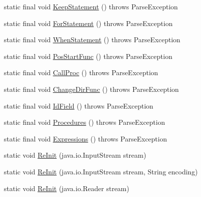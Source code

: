 \begin{DoxyCompactItemize}
\item 
static final void \mbox{\hyperlink{classorg_1_1tec_1_1comp_1_1interpreter_1_1_lang_parser_a405c37afd217408e11570b88520d8001}{Keep\+Statement}} ()  throws Parse\+Exception 
\item 
static final void \mbox{\hyperlink{classorg_1_1tec_1_1comp_1_1interpreter_1_1_lang_parser_a06360520488074a1a1fa3ced3417a5fa}{For\+Statement}} ()  throws Parse\+Exception 
\item 
static final void \mbox{\hyperlink{classorg_1_1tec_1_1comp_1_1interpreter_1_1_lang_parser_a9275380fc49d3c85996d406155673684}{When\+Statement}} ()  throws Parse\+Exception 
\item 
static final void \mbox{\hyperlink{classorg_1_1tec_1_1comp_1_1interpreter_1_1_lang_parser_a8863077e96b2b6e4dca2e4637b19e27b}{Pos\+Start\+Func}} ()  throws Parse\+Exception 
\item 
static final void \mbox{\hyperlink{classorg_1_1tec_1_1comp_1_1interpreter_1_1_lang_parser_ad976526414dbf20d9a5d1e3dcd94cdba}{Call\+Proc}} ()  throws Parse\+Exception 
\item 
static final void \mbox{\hyperlink{classorg_1_1tec_1_1comp_1_1interpreter_1_1_lang_parser_a30f030763ddb2f3dd46d9f0806cb5e83}{Change\+Dir\+Func}} ()  throws Parse\+Exception 
\item 
static final void \mbox{\hyperlink{classorg_1_1tec_1_1comp_1_1interpreter_1_1_lang_parser_a563be561b95084c5a41640d0bd559801}{Id\+Field}} ()  throws Parse\+Exception 
\item 
static final void \mbox{\hyperlink{classorg_1_1tec_1_1comp_1_1interpreter_1_1_lang_parser_a2554a84c19219dd423b352e350544084}{Procedures}} ()  throws Parse\+Exception 
\item 
static final void \mbox{\hyperlink{classorg_1_1tec_1_1comp_1_1interpreter_1_1_lang_parser_a05c6b36a7e76024a6c1d84d9f26df3fa}{Expressions}} ()  throws Parse\+Exception 
\item 
static void \mbox{\hyperlink{classorg_1_1tec_1_1comp_1_1interpreter_1_1_lang_parser_a94e815dda5476a089779061a106198b0}{Re\+Init}} (java.\+io.\+Input\+Stream stream)
\item 
static void \mbox{\hyperlink{classorg_1_1tec_1_1comp_1_1interpreter_1_1_lang_parser_a424b845bfd0ee9e35d5a069be759e501}{Re\+Init}} (java.\+io.\+Input\+Stream stream, String encoding)
\item 
static void \mbox{\hyperlink{classorg_1_1tec_1_1comp_1_1interpreter_1_1_lang_parser_a311bd1868d0ed38b543e09c488e78b49}{Re\+Init}} (java.\+io.\+Reader stream)
\item 

\end{DoxyCompactItemize}
